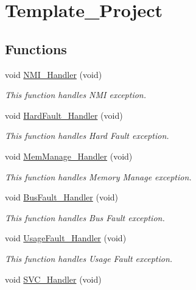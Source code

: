 \hypertarget{group___template___project}{}\section{Template\+\_\+\+Project}
\label{group___template___project}
\subsection*{Functions}
\begin{DoxyCompactItemize}
\item 
void \mbox{\hyperlink{group___template___project_ga6ad7a5e3ee69cb6db6a6b9111ba898bc}{N\+M\+I\+\_\+\+Handler}} (void)
\begin{DoxyCompactList}\small\item\em This function handles N\+MI exception. \end{DoxyCompactList}\item 
void \mbox{\hyperlink{group___template___project_ga2bffc10d5bd4106753b7c30e86903bea}{Hard\+Fault\+\_\+\+Handler}} (void)
\begin{DoxyCompactList}\small\item\em This function handles Hard Fault exception. \end{DoxyCompactList}\item 
void \mbox{\hyperlink{group___template___project_ga3150f74512510287a942624aa9b44cc5}{Mem\+Manage\+\_\+\+Handler}} (void)
\begin{DoxyCompactList}\small\item\em This function handles Memory Manage exception. \end{DoxyCompactList}\item 
void \mbox{\hyperlink{group___template___project_ga850cefb17a977292ae5eb4cafa9976c3}{Bus\+Fault\+\_\+\+Handler}} (void)
\begin{DoxyCompactList}\small\item\em This function handles Bus Fault exception. \end{DoxyCompactList}\item 
void \mbox{\hyperlink{group___template___project_ga1d98923de2ed6b7309b66f9ba2971647}{Usage\+Fault\+\_\+\+Handler}} (void)
\begin{DoxyCompactList}\small\item\em This function handles Usage Fault exception. \end{DoxyCompactList}\item 
void \mbox{\hyperlink{group___template___project_ga3e5ddb3df0d62f2dc357e64a3f04a6ce}{S\+V\+C\+\_\+\+Handler}} (void)

\end{DoxyCompactItemize}
